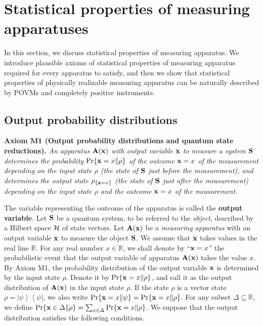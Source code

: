 \documentclass[12pt]{article}
\newcommand{\bA}{{\bf A}}
\newcommand{\bS}{{\bf S}}
\def\ps{\psi}
\newcommand{\rh}{\rho}
\newcommand{\De}{\Delta}
\newcommand{\bx}{{\bf x}}
\newcommand{\R}{\mathbb{R}}
\newcommand{\bra}[1]{\left\langle#1\right|}
\newcommand{\ket}[1]{\left|#1\right\rangle}
\begin{document}
\section{Statistical properties of measuring apparatuses}

In this section, we discuss statistical properties of measuring apparatus.
We introduce plausible axioms of statistical properties of measuring apparatus
required for every apparatus to satisfy, and then we show that  statistical properties 
of physically realizable measuring apparatus can be naturally described by POVMs
and completely positive instruments.

\subsection{Output probability distributions}

{\bf Axiom M1 (Output probability distributions and quantum state reductions).}
{\em An apparatus $\bA(\bx)$ with output variable $\bx$ to measure a system $\bS$ determines the probability 
$\Pr\{\bx=x\|\rh\}$ of  the outcome $\bx=x$ of the measurement depending 
on the input state $\rh$ (the state of\/ $\bS$ just before the measurement),
and determines the output state  $\rh_{\{\bx=x\}}$ (the state of\/ $\bS$ just after the measurement) 
depending on the input state $\rh$
and the outcome $\bx=x$ of the measurement.}
\bigskip



The variable representing the outcome of the apparatus is called the 
{\bf output variable}.
Let ${\bf S}$ be a quantum system, to be referred to the {\em object}, 
described by a Hilbert space ${\cal H}$ of state vectors.
Let $\bA(\bx)$ be a {\em measuring apparatus} with an output
variable $\bx$ to measure the {object} $\bS$.
We assume that $\bx$ takes values in the real line $\R$.
For any real number  $x\in\R$, we shall denote by ``$\bx=x$'' 
the probabilistic event
that the output variable of apparatus $\bA(\bx)$ takes the value $x$.
By Axiom M1, the probability distribution of the output variable 
$\bx$ is determined by the input state $\rh$.
Denote it by $\Pr\{\bx=x\|\rh\}$, and call it as 
the output distribution of $\bA(\bx)$  in the input state $\rh$.
 If the state $\rh$ is a vector state $\rh=\ket{\ps}\bra{\ps}$,
we also write $\Pr\{\bx=x\|\ps\}=\Pr\{\bx=x\|\rh\}$.
For any subset $\De\subseteq \R$, we define 
$\Pr\{\bx\in\De\|\rh\}=\sum_{x\in\De}\Pr\{\bx=x\|\rh\}$.
We suppose that the output distribution satisfies the following conditions. 
\end{document}
